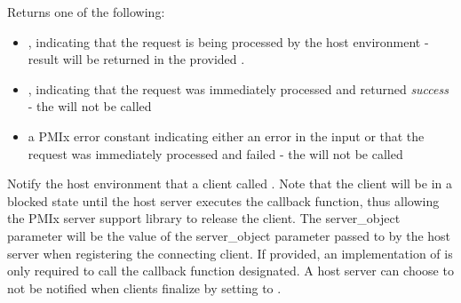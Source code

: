 
\begin{arglist}
\end{arglist}

Returns one of the following:

\begin{itemize}
    \item {}, indicating that the request is being processed by the host environment - result will be returned in the provided .
    \item {}, indicating that the request was immediately processed and returned \textit{success} - the  will not be called
    \item a PMIx error constant indicating either an error in the input or that the request was immediately processed and failed - the  will not be called
\end{itemize}

\descr

Notify the host environment that a client called .
Note that the client will be in a blocked state until the host server executes the callback function, thus allowing the PMIx server support library to release the client.
The server_object parameter will be the value of the server_object parameter passed to
 by the host server when registering the connecting client.  If provided, an implementation of 
is only required to
call the callback function designated.  A host server can choose to not be notified when clients finalize by setting  to .

